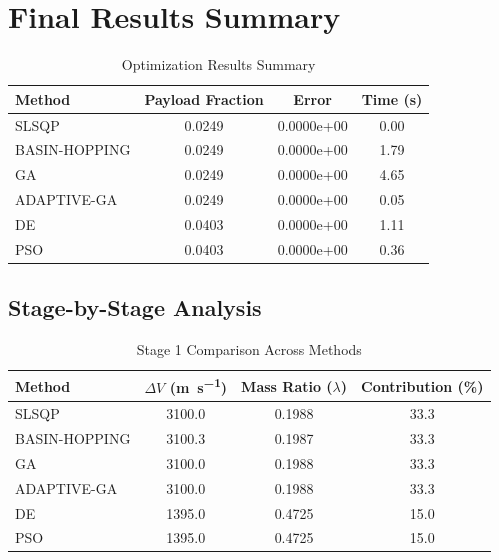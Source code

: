 \documentclass{article}
\begin{document}
\section{Final Results Summary}
\begin{table}[H]
\centering
\caption{Optimization Results Summary}
\begin{tabular}{lS[table-format=1.4]S[table-format=1.4e-1]S[table-format=1.2]}
\toprule
Method & {Payload Fraction} & {Error} & {Time (\si{\second})} \\
\midrule
SLSQP        & 0.0249 & 0.0000e+00 & 0.00 \\
BASIN-HOPPING & 0.0249 & 0.0000e+00 & 1.79 \\
GA           & 0.0249 & 0.0000e+00 & 4.65 \\
ADAPTIVE-GA  & 0.0249 & 0.0000e+00 & 0.05 \\
DE           & 0.0403 & 0.0000e+00 & 1.11 \\
PSO          & 0.0403 & 0.0000e+00 & 0.36 \\
\bottomrule
\end{tabular}
\end{table}

\subsection{Stage-by-Stage Analysis}


\begin{table}[H]
\centering
\caption{Stage 1 Comparison Across Methods}
\begin{tabular}{lS[table-format=4.1]S[table-format=1.4]S[table-format=3.1]}
\toprule
Method & {$\Delta V$ (\si{\meter\per\second})} & {Mass Ratio ($\lambda$)} & {Contribution (\%)} \\
\midrule
SLSQP        & 3100.0 & 0.1988 & 33.3 \\
BASIN-HOPPING & 3100.3 & 0.1987 & 33.3 \\
GA           & 3100.0 & 0.1988 & 33.3 \\
ADAPTIVE-GA  & 3100.0 & 0.1988 & 33.3 \\
DE           & 1395.0 & 0.4725 & 15.0 \\
PSO          & 1395.0 & 0.4725 & 15.0 \\
\bottomrule
\end{tabular}
\end{table}
\end{document}
